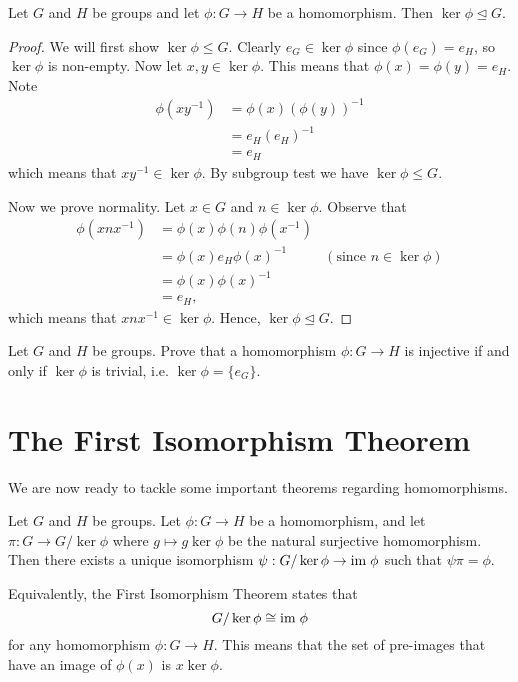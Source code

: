 \begin{proposition}\label{prop-kernel-is-normal-subgroup-of-domain}
    Let $G$ and $H$ be groups and let $\phi: G \to H$ be a homomorphism. Then $\ker\phi \unlhd G$.
\end{proposition}
\begin{proof}
    We will first show $\ker\phi\leq G$. Clearly $e_G \in \ker\phi$ since $\phi(e_G) = e_H$, so $\ker\phi$ is non-empty. Now let $x, y \in \ker\phi$. This means that $\phi(x) = \phi(y) = e_H$. Note
    \begin{align*}
        \phi(xy^{-1}) &= \phi(x)\left(\phi(y)\right)^{-1}\\
        &= e_H(e_H)^{-1}\\
        &= e_H
    \end{align*}
    which means that $xy^{-1}\in\ker\phi$. By subgroup test we have $\ker\phi\leq G$.

    Now we prove normality. Let $x \in G$ and $n \in \ker\phi$. Observe that
    \begin{align*}
        \phi(xnx^{-1}) &= \phi(x)\phi(n)\phi(x^{-1})\\
        &= \phi(x)e_H\phi(x)^{-1} & (\text{since } n \in \ker\phi)\\
        &= \phi(x)\phi(x)^{-1}\\
        &= e_H,
    \end{align*}
    which means that $xnx^{-1} \in \ker\phi$. Hence, $\ker\phi \unlhd G$.
\end{proof}

\begin{exercise}\label{exercise-trivial-kernel-means-injective}
    Let $G$ and $H$ be groups. Prove that a homomorphism $\phi: G \to H$ is injective if and only if $\ker \phi$ is trivial, i.e. $\ker \phi = \{e_G\}$.
\end{exercise}



\section{The First Isomorphism Theorem}
We are now ready to tackle some important theorems regarding homomorphisms.

\begin{theorem}[Isomorphism I]\label{thrm-isomorphism-1}
    Let $G$ and $H$ be groups. Let $\phi: G \to H$ be a homomorphism, and let $\pi: G \to G/\ker\phi$ where $g\mapsto g\ker\phi$ be the natural surjective homomorphism. Then there exists a unique isomorphism $\psi: G/\ker\phi \to \mathrm{im}\;\phi$ such that $\psi\pi = \phi$.
\end{theorem}
\begin{remark}
    Equivalently, the First Isomorphism Theorem states that
    \[
        G/\ker\phi \cong \mathrm{im}\;\phi
    \]
    for any homomorphism $\phi: G \to H$. This means that the set of pre-images that have an image of $\phi(x)$ is $x\ker\phi$.
\end{remark}

